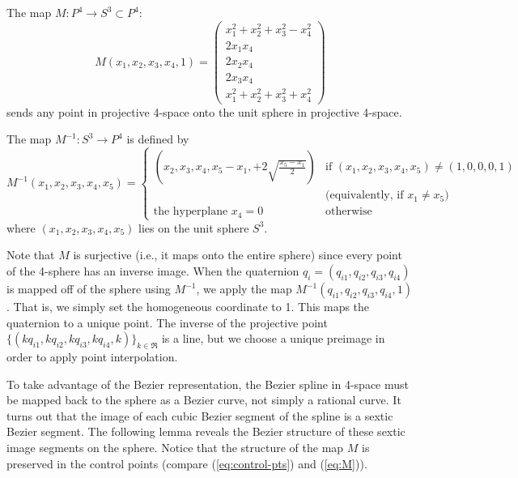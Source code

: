 \begin{corollary}
The map 
$M:P^4 \rightarrow S^3 \subset P^4$:
\begin{equation}
\label{eq:M}
	M(x_1,x_2,x_3,x_4,1) = \left( \begin{array}{c}
		x_1^2+x_2^2+x_3^2-x_4^2 \\
		2x_1x_4 \\
		2x_2x_4 \\
		2x_3x_4 \\
		x_1^2+x_2^2+x_3^2+x_4^2
		\end{array} \right)
\end{equation}
sends any point in projective 4-space onto the unit sphere in projective
4-space.
\end{corollary}

\begin{lemma}
\label{lem:invM}
The map $M^{-1}:S^3 \rightarrow P^4$ is defined by
\begin{equation}
\label{eq:invM}
M^{-1}(x_1,x_2,x_3,x_4,x_5)=
\left\{ \begin{array}{ll}
(x_2,x_3,x_4,x_5-x_1,+2\sqrt{\frac{x_5-x_1}{2}}) 
	& \mbox{if } (x_1,x_2,x_3,x_4,x_5) \neq (1,0,0,0,1) \\
	& \mbox{(equivalently, if } x_1 \neq x_5 \mbox{)} \\
\mbox{the hyperplane } x_4 = 0 
	& \mbox{otherwise}
\end{array} \right.
\end{equation}
where $(x_1,x_2,x_3,x_4,x_5)$ lies on the unit sphere $S^3$.
\end{lemma}

Note that $M$ is surjective (i.e., it maps onto the entire sphere)
since every point of the 4-sphere has an inverse image.
When the quaternion $q_i = (q_{i1},q_{i2},q_{i3},q_{i4})$ is mapped off
of the sphere using $M^{-1}$,
we apply the map $M^{-1}(q_{i1},q_{i2},q_{i3},q_{i4},1)$.
That is, we simply set the homogeneous coordinate to 1.
This maps the quaternion to a unique point.
The inverse of the projective point 
$\{(kq_{i1},kq_{i2},kq_{i3},kq_{i4},k)\}_{k \in \Re}$
is a line,
but we choose a unique preimage in order to apply point interpolation.

To take advantage of the Bezier representation,
the Bezier spline in 4-space must be mapped back to the sphere
as a Bezier curve, not simply a rational curve.
It turns out that the image of each cubic Bezier segment of the spline
is a sextic Bezier segment.
The following lemma reveals the Bezier structure of these sextic
image segments on the sphere.
Notice that the structure of the map $M$ is preserved in the control
points (compare (\ref{eq:control-pts}) and (\ref{eq:M})).

